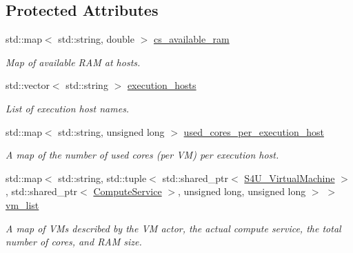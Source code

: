 \subsection*{Protected Attributes}
\begin{DoxyCompactItemize}
\item 
\mbox{\label{classwrench_1_1_cloud_service_a56d772651ad005c9de543ca24327b9c6}} 
std\+::map$<$ std\+::string, double $>$ \hyperlink{classwrench_1_1_cloud_service_a56d772651ad005c9de543ca24327b9c6}{cs\+\_\+available\+\_\+ram}
\begin{DoxyCompactList}\small\item\em Map of available R\+AM at hosts. \end{DoxyCompactList}\item 
\mbox{\label{classwrench_1_1_cloud_service_a8225cae457e491f3f3aad32653910ea0}} 
std\+::vector$<$ std\+::string $>$ \hyperlink{classwrench_1_1_cloud_service_a8225cae457e491f3f3aad32653910ea0}{execution\+\_\+hosts}
\begin{DoxyCompactList}\small\item\em List of execution host names. \end{DoxyCompactList}\item 
\mbox{\label{classwrench_1_1_cloud_service_afda7fb1800d2d418e2a586925ffd4013}} 
std\+::map$<$ std\+::string, unsigned long $>$ \hyperlink{classwrench_1_1_cloud_service_afda7fb1800d2d418e2a586925ffd4013}{used\+\_\+cores\+\_\+per\+\_\+execution\+\_\+host}
\begin{DoxyCompactList}\small\item\em A map of the number of used cores (per VM) per execution host. \end{DoxyCompactList}\item 
\mbox{\label{classwrench_1_1_cloud_service_a41782dd4332c11a992997562132f35e1}} 
std\+::map$<$ std\+::string, std\+::tuple$<$ std\+::shared\+\_\+ptr$<$ \hyperlink{classwrench_1_1_s4_u___virtual_machine}{S4\+U\+\_\+\+Virtual\+Machine} $>$, std\+::shared\+\_\+ptr$<$ \hyperlink{classwrench_1_1_compute_service}{Compute\+Service} $>$, unsigned long, unsigned long $>$ $>$ \hyperlink{classwrench_1_1_cloud_service_a41782dd4332c11a992997562132f35e1}{vm\+\_\+list}
\begin{DoxyCompactList}\small\item\em A map of V\+Ms described by the VM actor, the actual compute service, the total number of cores, and R\+AM size. \end{DoxyCompactList}\end{DoxyCompactItemize}
